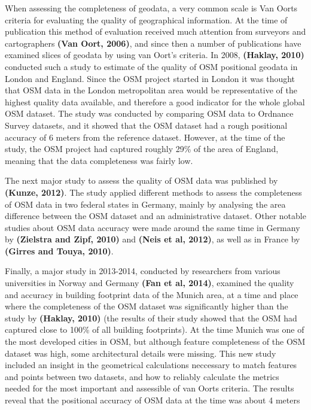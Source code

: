 \documentclass{kththesis}
\begin{document}
When assessing the completeness of geodata, a very common scale is Van Oorts criteria for evaluating the quality of geographical information.
At the time of publication this method of evaluation received much attention from surveyors and cartographers \textbf{(Van Oort, 2006)}, and since then a number of publications have examined slices of geodata by using van Oort's criteria.
In 2008, \textbf{(Haklay, 2010)} conducted such a study to estimate of the quality of OSM positional geodata in London and England.
Since the OSM project started in London it was thought that OSM data in the London metropolitan area would be representative of the highest quality data available, and therefore a good indicator for the whole global OSM dataset.
The study was conducted by comparing OSM data to Ordnance Survey datasets, and it showed that the OSM dataset had a rough positional accuracy of 6 meters from the reference dataset.
However, at the time of the study, the OSM project had captured roughly 29\% of the area of England, meaning that the data completeness was fairly low.

The next major study to assess the quality of OSM data was published by \textbf{(Kunze, 2012)}.
The study applied different methods to assess the completeness of OSM data in two federal states in Germany, mainly by analysing the area difference between the OSM dataset and an administrative dataset.
Other notable studies about OSM data accuracy were made around the same time in Germany by \textbf{(Zielstra and Zipf, 2010)} and \textbf{(Neis et al, 2012)}, as well as in France by \textbf{(Girres and Touya, 2010)}.

Finally, a major study in 2013-2014, conducted by researchers from various universities in Norway and Germany \textbf{(Fan et al, 2014)}, examined the quality and accuracy in building footprint data of the Munich area, at a time and place where the completeness of the OSM dataset was significantly higher than the study by \textbf{(Haklay, 2010)} (the results of their study showed that the OSM had captured close to 100\% of all building footprints).
At the time Munich was one of the most developed cities in OSM, but although feature completeness of the OSM dataset was high, some architectural details were missing.
This new study included an insight in the geometrical calculations neccessary to match features and points between two datasets, and how to reliably calculate the metrics needed for the most important and assessible of van Oorts criteria.
The results reveal that the positional accuracy of OSM data at the time was about 4 meters
\end{document}
